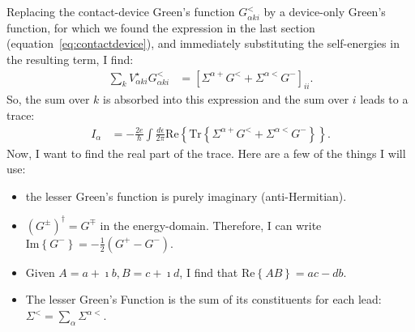 Replacing the contact-device Green's function $G^<_{\alpha ki}$ by a device-only Green's function, for which we found the expression in the last section (equation~\ref{eq:contactdevice}), and immediately substituting the self-energies in the resulting term, I find:
\begin{align*}
\sum_{k} V^\star_{\alpha ki} G^<_{\alpha ki} &= \left[\Sigma^{\alpha+} G^< + \Sigma^{\alpha <} G^-\right]_{ii}.
\end{align*}
So, the sum over $k$ is absorbed into this expression and the sum over $i$ leads to a trace:
\begin{align*}
I_\alpha &= -\frac{2e}{\hbar} \int \frac{d\epsilon}{2\pi} \text{Re} \left\{ \text{Tr} \left \{ \Sigma^{\alpha+} G^< + \Sigma^{\alpha <} G^-\right\}\right\}.
\end{align*}
Now, I want to find the real part of the trace. Here are a few of the things I will use:
\begin{itemize}
\item the lesser Green's function is purely imaginary (anti-Hermitian). 
\item $(G^\pm)^\dagger = G^\mp$ in the energy-domain. Therefore, I can write $\text{Im}\left\{ G^-\right\} = - \frac{1}{2} \left( G^+ - G^- \right)$.
\item Given $A=a+\imath b, B = c + \imath d$, I find that $\text{Re}\left\{ AB \right\} = ac - db$.
\item The lesser Green's Function is the sum of its constituents for each lead: $\Sigma^< = \sum_\alpha \Sigma^{\alpha<}$.
\end{itemize}

